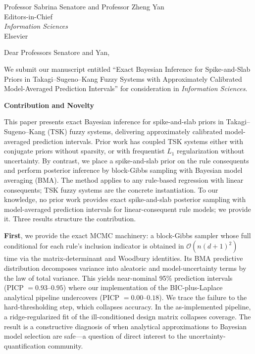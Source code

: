 \documentclass[11pt]{letter}
\begin{document}
\begin{letter}{Professor Sabrina Senatore and Professor Zheng Yan \\ Editors-in-Chief \\ \textit{Information Sciences} \\ Elsevier}

\opening{Dear Professors Senatore and Yan,}

We submit our manuscript entitled ``Exact Bayesian Inference for Spike-and-Slab Priors in Takagi--Sugeno--Kang Fuzzy Systems with Approximately Calibrated Model-Averaged Prediction Intervals'' for consideration in \textit{Information Sciences}.

\noindent\textbf{Contribution and Novelty}

This paper presents exact Bayesian inference for spike-and-slab priors in Takagi--Sugeno--Kang (TSK) fuzzy systems, delivering approximately calibrated model-averaged prediction intervals.
Prior work has coupled TSK systems either with conjugate priors without sparsity, or with frequentist $L_1$ regularization without uncertainty.
By contrast, we place a spike-and-slab prior on the rule consequents and perform posterior inference by block-Gibbs sampling with Bayesian model averaging (BMA). The method applies to any rule-based regression with linear consequents; TSK fuzzy systems are the concrete instantiation.
To our knowledge, no prior work provides exact spike-and-slab posterior sampling with model-averaged prediction intervals for linear-consequent rule models; we provide it. Three results structure the contribution.

\textbf{First}, we provide the exact MCMC machinery: a block-Gibbs sampler whose full conditional for each rule's inclusion indicator is obtained in $\mathcal{O}(n(d+1)^2)$ time via the matrix-determinant and Woodbury identities.
Its BMA predictive distribution decomposes variance into aleatoric and model-uncertainty terms by the law of total variance. This yields near-nominal 95\% prediction intervals (PICP $=0.93$--$0.95$) where our implementation of the BIC-plus-Laplace analytical pipeline undercovers (PICP $=0.00$--$0.18$).
We trace the failure to the hard-thresholding step, which collapses accuracy.
In the as-implemented pipeline, a ridge-regularized fit of the ill-conditioned design matrix collapses coverage.
The result is a constructive diagnosis of when analytical approximations to Bayesian model selection are safe---a question of direct interest to the uncertainty-quantification community.


\end{letter}
\end{document}
